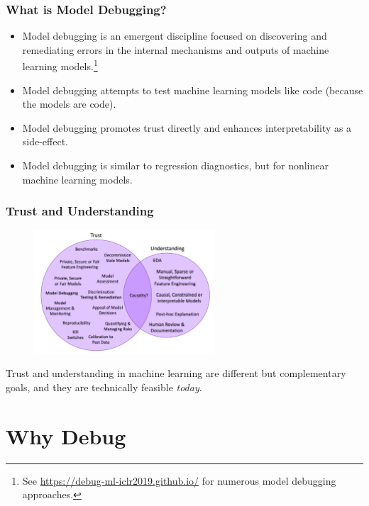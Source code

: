 \documentclass[11pt,
               aspectratio=169,
               hyperref={colorlinks}
               ]{beamer}
\begin{document}
		\begin{frame}
		
			\frametitle{What is Model Debugging?}
		
			\begin{itemize}
				\item Model debugging is an emergent discipline focused on discovering and remediating errors in the internal mechanisms and outputs of machine learning models.\footnote{\tiny{See \url{https://debug-ml-iclr2019.github.io/} for numerous model debugging approaches.}} 
				\item Model debugging attempts to test machine learning models like code (because the models are code).
				\item Model debugging promotes trust directly and enhances interpretability as a side-effect.
				\item Model debugging is similar to regression diagnostics, but for nonlinear machine learning models.
			\end{itemize}
		
		\end{frame}

	
		\begin{frame}[t]

 				\frametitle{Trust and Understanding}
      
 				\begin{figure}
   				\begin{center}
     					\includegraphics[height=130pt]{../img/trust_understanding.png}
   				\end{center}
 				\end{figure}

 			Trust and understanding in machine learning are different but complementary goals, and they are technically feasible \textit{today}.
    
		\end{frame}

	\section{Why Debug}
\end{document}
